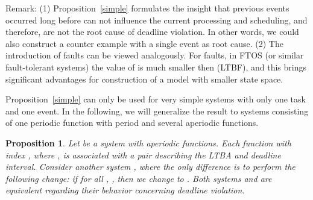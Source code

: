 \documentclass[10pt, a4paper, onecolumn, conference, compsocconf]{IEEEtran}
\newtheorem{prop}{Proposition}
\begin{document}
Remark: (1) Proposition~\ref{simple} formulates the insight that previous events occurred long before can not influence the current processing and scheduling, and therefore, are not the root cause of deadline violation. In other words, we could also construct a counter example with a single event as root cause.
(2) The introduction of faults can be viewed analogously. For faults, in FTOS (or similar fault-tolerant systems) the value of  is much smaller then  (LTBF), and this brings
significant advantages for construction of a model with smaller state space.

Proposition~\ref{simple} can only be used for very simple systems with only one task and one event. In the following, we will generalize the result to systems consisting of one periodic function with period  and several aperiodic functions.

\begin{prop}\label{more.events}
 Let  be a system  with  aperiodic functions. Each function with index , where , is associated with a pair
  describing the LTBA and deadline interval.
 Consider another system , where the only difference is to perform the following change: if for all ,
, then we change  to . Both systems  and 
are equivalent regarding their behavior concerning deadline
violation.
\end{prop}
\end{document}
